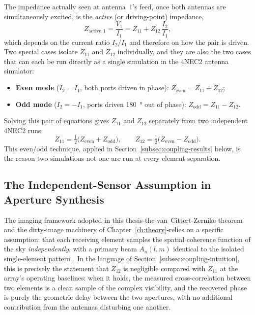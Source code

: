 The impedance actually seen at antenna~1's feed, once both antennas are
simultaneously excited, is the \emph{active} (or driving-point) impedance,
\begin{equation}
    Z_{\mathrm{active},1} = \frac{V_1}{I_1} = Z_{11} + Z_{12}\,\frac{I_2}{I_1} ,
    \label{eq:driving-impedance}
\end{equation}
which depends on the current ratio $I_2/I_1$ and therefore on how the pair is
driven. Two special cases isolate $Z_{11}$ and $Z_{12}$ individually, and they
are also the two cases that can each be run directly as a single simulation
in the 4NEC2 antenna simulator:
\begin{itemize}[leftmargin=1.5em,itemsep=1pt,topsep=2pt]
  \item \textbf{Even mode} ($I_2=I_1$, both ports driven in phase):
        $Z_\mathrm{even}=Z_{11}+Z_{12}$;
  \item \textbf{Odd mode} ($I_2=-I_1$, ports driven \SI{180}{\degree} out of
        phase): $Z_\mathrm{odd}=Z_{11}-Z_{12}$.
\end{itemize}
Solving this pair of equations gives $Z_{11}$ and $Z_{12}$ separately from two
independent 4NEC2 runs:
\begin{equation}
    Z_{11} = \tfrac{1}{2}\big(Z_\mathrm{even}+Z_\mathrm{odd}\big),
    \qquad
    Z_{12} = \tfrac{1}{2}\big(Z_\mathrm{even}-Z_\mathrm{odd}\big).
    \label{eq:z11-z12-solve}
\end{equation}
This even/odd technique, applied in Section~\ref{subsec:coupling-results}
below, is the reason two simulations-not one-are run at every element
separation.

\subsection{The Independent-Sensor Assumption in Aperture Synthesis}
\label{subsec:independence}

The imaging framework adopted in this thesis-the van~Cittert-Zernike theorem
and the dirty-image machinery of Chapter~\ref{ch:theory}-relies on a specific
assumption: that each receiving element samples the spatial coherence
function of the sky \emph{independently}, with a primary beam $A_n(l,m)$
identical to the isolated single-element pattern \citep{tms2017}. In the
language of Section~\ref{subsec:coupling-intuition}, this is precisely the
statement that $Z_{12}$ is negligible compared with $Z_{11}$ at the array's
operating baselines: when it holds, the measured cross-correlation between
two elements is a clean sample of the complex visibility, and the recovered
phase is purely the geometric delay between the two apertures, with no
additional contribution from the antennas disturbing one another.

